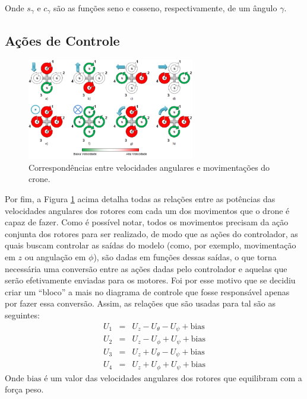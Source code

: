 \vspace{+0.5cm}

Onde $s_{\gamma}$ e $c_{\gamma}$ são as funções seno e cosseno, respectivamente, de um ângulo $\gamma$.

\subsection{Ações de Controle \label{sec:ac_control}}

\begin{figure}[h!]
    \centering
    \includegraphics[width=0.65\textwidth]{figs/mov_drone.png}
    \caption{Correspondências entre velocidades angulares e movimentações do crone. \cite{usp}}
    \label{fig:movimento}
\end{figure}

\pagebreak

Por fim, a Figura \ref{fig:movimento} acima detalha todas as relações entre as potências das velocidades angulares 
dos rotores com cada um dos movimentos que o drone é capaz de fazer.
Como é possível notar, todos os movimentos precisam da ação conjunta dos rotores para ser realizado, de modo que 
as ações do controlador, as quais buscam controlar as saídas do modelo (como, por exemplo, movimentação em $z$ ou 
angulação em $\phi$), são dadas em funções dessas saídas, o que torna necessária uma conversão entre as ações dadas 
pelo controlador e aquelas que serão efetivamente enviadas para os motores. Foi por esse motivo que se decidiu criar 
um ``bloco'' a mais no diagrama de controle que fosse responsável apenas por fazer essa conversão. Assim, as relações 
que são usadas para tal são as seguintes:
\begin{eqnarray}
    U_1 &=& U_z - U_\theta - U_\psi + \text{bias} \\
    U_2 &=& U_z - U_\phi + U_\psi + \text{bias} \\
    U_3 &=& U_z + U_\theta - U_\psi + \text{bias} \\
    U_4 &=& U_z + U_\phi + U_\psi + \text{bias}
\end{eqnarray}
Onde $\text{bias}$ é um valor das velocidades angulares dos rotores que equilibram com a força peso.